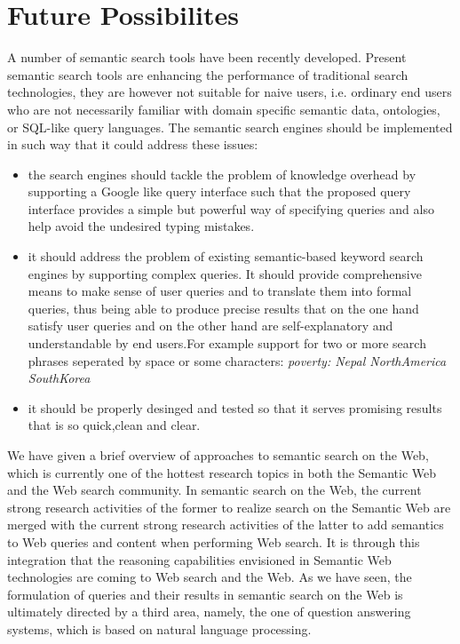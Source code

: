 \documentclass[12pt,a4]{article}
\begin{document}
\section{Future Possibilites }

A number of semantic search tools have been recently developed. Present semantic search tools are enhancing the performance of traditional search technologies, they are however not suitable for naive users, i.e. ordinary end users who are not necessarily familiar with domain specific semantic data, ontologies, or SQL-like query languages. The semantic search engines should be implemented in such way that it could address these issues:
\begin{itemize}
\item the search engines should tackle the problem of knowledge overhead by supporting a Google like query interface such that the proposed query interface provides a simple but powerful way of specifying queries and also help avoid the undesired typing mistakes.
\item it should address the problem of existing semantic-based keyword search engines by supporting complex queries. It should provide comprehensive means to make sense of user queries and to translate them into formal queries, thus being able to produce precise results that on the one hand satisfy user queries and on the other hand are self-explanatory and understandable by end users.For example support for two or more search phrases seperated by space or some characters: \textit{poverty: Nepal NorthAmerica SouthKorea } 
\item it should be properly desinged and tested so that it serves promising results that is so quick,clean and clear.
\end{itemize}


We have given a brief overview of approaches to semantic search on the Web, which is currently one of the hottest research topics in both the Semantic Web and the Web search community. In semantic search on the Web, the current strong research activities of the former to realize search on the Semantic Web are merged with the current strong research activities of the latter to add semantics to Web queries and content when performing Web search. It is through this integration that the reasoning capabilities envisioned in Semantic Web technologies are coming to Web search and the Web. As we have seen, the formulation of queries and their results in semantic search on the Web is ultimately directed by a third area, namely, the one of question answering systems, which is based on natural language processing.
\end{document}
